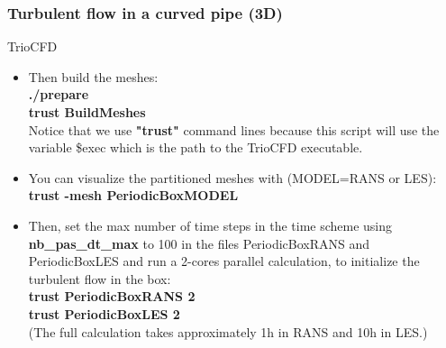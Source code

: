 \documentclass[10pt, hyperref={unicode=true,pdfusetitle, bookmarks=true,bookmarksnumbered=false,bookmarksopen=false, breaklinks=false,pdfborder={0 0 1},backref=true,colorlinks=true,linkcolor=darkblue,pageanchor}]{beamer}
\begin{document}
\begin{frame}
\frametitle{Turbulent flow in a curved pipe (3D)}
\begin{block}{TrioCFD}

\begin{itemize}
\item Then build the meshes:\\
\textbf{./prepare} \\
\textbf{trust BuildMeshes} \\
Notice that we use \textbf{"trust"} command lines because this script will use the variable \$exec which is the path to the TrioCFD executable.

\item You can visualize the partitioned meshes with (MODEL=RANS or LES): \\
\textbf{trust -mesh PeriodicBoxMODEL}

\item Then, set the max number of time steps in the time scheme using \textbf{nb\_pas\_dt\_max} to 100 in the files PeriodicBoxRANS and PeriodicBoxLES and run a 2-cores parallel calculation, to initialize the turbulent flow in the box: \\
\textbf{trust PeriodicBoxRANS 2} \\
\textbf{trust PeriodicBoxLES 2} \\
(The full calculation takes approximately 1h in RANS and 10h in LES.)
\end{itemize}

\end{block}
\end{frame}
\end{document}
